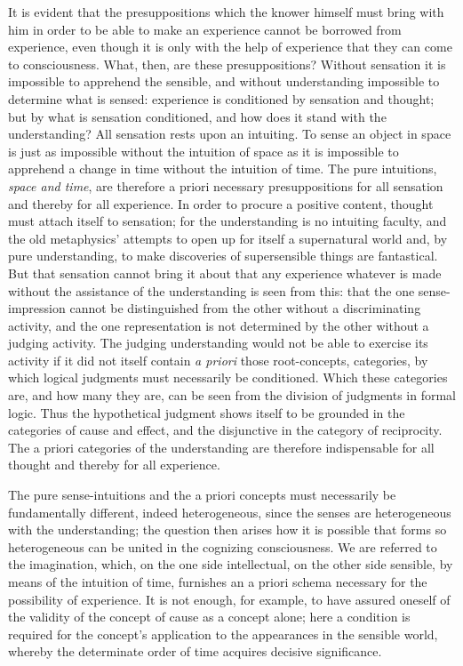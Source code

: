 \documentclass[12pt]{article}
\begin{document}
It is evident that the presuppositions which the knower himself must bring
with him in order to be able to make an experience cannot be borrowed from
experience, even though it is only with the help of experience that they
can come to consciousness. What, then, are these presuppositions? Without
sensation it is impossible to apprehend the sensible, and without
understanding impossible to determine what is sensed: experience is
conditioned by sensation and thought; but by what is sensation
conditioned, and how does it stand with the understanding? All sensation
rests upon an intuiting. To sense an object in space is just as impossible
without the intuition of space as it is impossible to apprehend a change
in time without the intuition of time. The pure intuitions, \emph{space
and time}, are therefore a priori necessary presuppositions for all
sensation and thereby for all experience. In order to procure a positive
content, thought must attach itself to sensation; for the understanding is
no intuiting faculty, and the old metaphysics' attempts to open up for
itself a supernatural world and, by pure understanding, to make
discoveries of supersensible things are fantastical. But that sensation
cannot bring it about that any experience whatever is made without the
assistance of the understanding is seen from this: that the one
sense-impression cannot be distinguished from the other without a
discriminating activity, and the one representation is not determined by
the other without a judging activity. The judging understanding would not
be able to exercise its activity if it did not itself contain
\textit{a priori} those root-concepts, categories, by which logical
judgments must necessarily be conditioned.
Which these categories are, and how many they are, can be seen from the
division of judgments in formal logic. Thus the hypothetical judgment
shows itself to be grounded in the categories of cause and effect, and the
disjunctive in the category of reciprocity. The a priori categories of the
understanding are therefore indispensable for all thought and thereby for
all experience.

The pure sense-intuitions and the a priori concepts must necessarily be
fundamentally different, indeed heterogeneous, since the senses are
heterogeneous with the understanding; the question then arises how it is
possible that forms so heterogeneous can be united in the cognizing
consciousness. We are referred to the imagination, which, on the one side
intellectual, on the other side sensible, by means of the intuition of
time, furnishes an a priori schema necessary for the possibility of
experience. It is not enough, for example, to have assured oneself of the
validity of the concept of cause as a concept alone; here a condition is
required for the concept's application to the appearances in the sensible
world, whereby the determinate order of time acquires decisive
significance.
\end{document}
